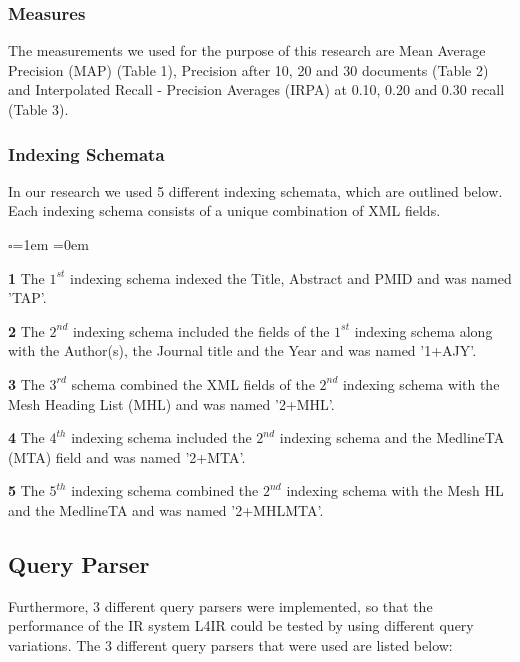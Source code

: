 \subsubsection{Measures} \label{Measures}

The measurements we used for the purpose of this research are Mean Average Precision (MAP) (Table 1), Precision after 10, 20 and 30 documents (Table 2) and Interpolated Recall - Precision Averages (IRPA) at 0.10, 0.20 and 0.30 recall (Table 3).

\subsubsection{Indexing Schemata}

In our research we used 5 different indexing schemata, which are outlined below. Each indexing schema consists of a unique combination of XML fields. 

\begin{list}{$\square$}{\leftmargin=1em \itemindent=0em}
	\item[\textbf{1}] The  $1^{st}$ indexing schema indexed the Title, Abstract and PMID and was named 'TAP'.
    \item[\textbf{2}] The $2^{nd}$ indexing schema included the fields of the $1^{st}$ indexing schema along with the Author(s), the Journal title and the Year and was named '1+AJY'.
    \item[\textbf{3}] The $3^{rd}$ schema combined the XML fields of the $2^{nd}$ indexing schema with the Mesh Heading List (MHL) and was named '2+MHL'.
    \item[\textbf{4}] The $4^{th}$ indexing schema included the $2^{nd}$ indexing schema and the MedlineTA (MTA) field and was named '2+MTA'.
    \item[\textbf{5}] The $5^{th}$ indexing schema combined the  $2^{nd}$ indexing schema with the Mesh HL and the MedlineTA and was named '2+MHLMTA'.
\end{list}
\vspace{-0.2cm}

\subsection{Query Parser}

Furthermore, 3 different query parsers were implemented, so that the performance of the IR system L4IR could be tested by using different query variations. The 3 different query parsers that were used are listed below: 

